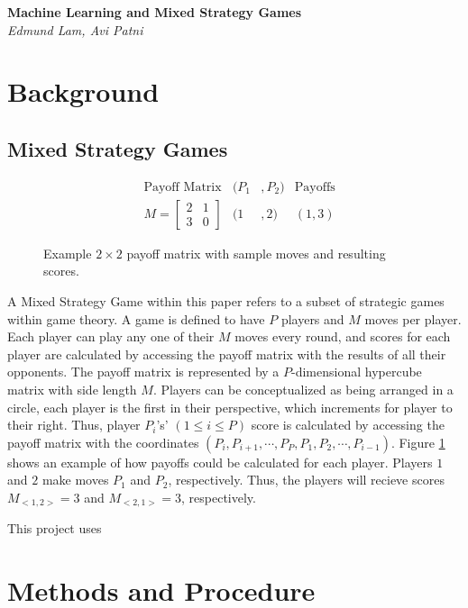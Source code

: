 \documentclass{article}
\begin{document}
\begin{titlepage}
	\begin{center}
		\Large\textbf{Machine Learning and Mixed Strategy Games}\\
		\large\textit{Edmund Lam, Avi Patni}
	\end{center}
\end{titlepage}

\section{Background}
\subsection{Mixed Strategy Games}

\begin{figure}[b]
  \caption{Example $2\times2$ payoff matrix with sample moves and resulting scores.}
  	\begin{align*}
  	&\text{Payoff Matrix} &(P_1&,P_2) &\text{Payoffs}\\
	  &M=
	  \begin{bmatrix}
		  2 & 1\\
		  3 & 0
	  \end{bmatrix}
	  &(1&,2)
	  &(1,3)
	  \end{align*}
  \label{fig:1}
\end{figure}

A Mixed Strategy Game within this paper refers to a subset of strategic games within game theory. A game is defined to have $P$ players and $M$ moves per player. Each player can play any one of their $M$ moves every round, and scores for each player are calculated by accessing the payoff matrix with the results of all their opponents. The payoff matrix is represented by a $P$-dimensional hypercube matrix with side length $M$. Players can be conceptualized as being arranged in a circle, each player is the first in their perspective, which increments for player to their right. Thus, player $P_i$'s' $(1\leq i\leq P)$ score is calculated by accessing the payoff matrix with the coordinates $(P_i, P_{i+1}, \cdots , P_P, P_1, P_2, \cdots , P_{i-1})$. Figure \ref{fig:1} shows an example of how payoffs could be calculated for each player. Players $1$ and $2$ make moves $P_1$ and $P_2$, respectively. Thus, the players will recieve scores $M_{<1,2>}=3$ and $M_{<2,1>}=3$, respectively.

This project uses 


\section{Methods and Procedure}
\end{document}
